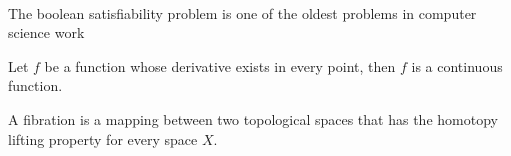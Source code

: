 ~\label{section:sat-solving}


The boolean satisfiability problem is one of the oldest problems in computer science
work

\begin{theorem}
  Let $f$ be a function whose derivative exists in every point, then $f$ is
  a continuous function.
\end{theorem}

\begin{definition}[Fibration]
  A fibration is a mapping between two topological spaces that has the homotopy lifting property for every space $X$.
\end{definition}



